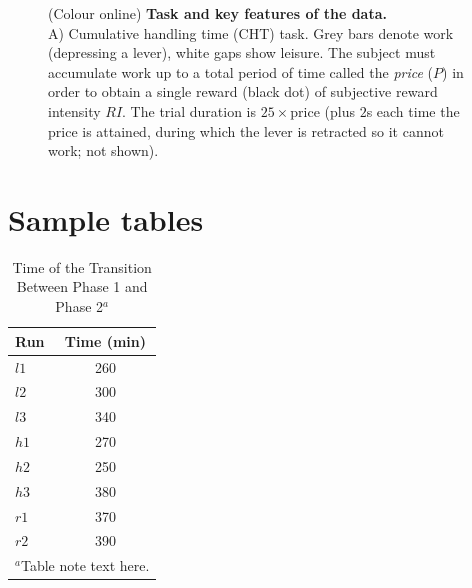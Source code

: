 \documentclass[NETN]{stjour}
\begin{document}
\begin{figure}[ht] 
\caption{(Colour online) \textbf{Task and key features of the
 data.} \\
 A) Cumulative handling time (CHT) task. Grey bars denote work
(depressing a lever), white gaps show leisure. The subject must
accumulate work up to a total period of time called the
\emph{price} ($P$) in order to obtain a single reward (black dot) of subjective reward
intensity $RI$. The trial duration is $25\times \mathrm{price}$ (plus
$2$s each time the price is attained, during which the lever is retracted so it cannot
work; not shown).}
\label{fig:task_data2}
\end{figure}

\newpage
\section{Sample tables}

\begin{table}[!ht]
\caption{Time of the Transition Between Phase 1 and Phase 2$^{a}$}
\label{tab:label}
\centering
\begin{tabular}{lc}
\hline
 Run  & Time (min)  \\
\hline
  $l1$  & 260   \\
  $l2$  & 300   \\
  $l3$  & 340   \\
  $h1$  & 270   \\
  $h2$  & 250   \\
  $h3$  & 380   \\
  $r1$  & 370   \\
  $r2$  & 390   \\
\hline
\multicolumn{2}{l}{$^{a}$Table note text here.}
\end{tabular}
\end{table}
\end{document}
